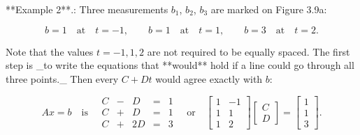 **Example 2**.: Three measurements \(b_{1}\), \(b_{2}\), \(b_{3}\) are marked on Figure 3.9a:

\[b=1\quad\text{at}\quad t=-1,\qquad b=1\quad\text{at}\quad t=1,\qquad b=3\quad \text{at}\quad t=2.\]

Note that the values \(t=-1,1,2\) are not required to be equally spaced. The first step is _to write the equations that **would** hold if a line could go through all three points._ Then every \(C+Dt\) would agree exactly with \(b\):

\[Ax=b\quad\text{is}\quad\begin{array}{ccccccc}C&-&D&=&1\\ C&+&D&=&1\\ C&+&2D&=&3\end{array}\quad\text{or}\quad\begin{bmatrix}1&-1\\ 1&1\\ 1&2\end{bmatrix}\begin{bmatrix}C\\ D\end{bmatrix}=\begin{bmatrix}1\\ 1\\ 3\end{bmatrix}.\] 